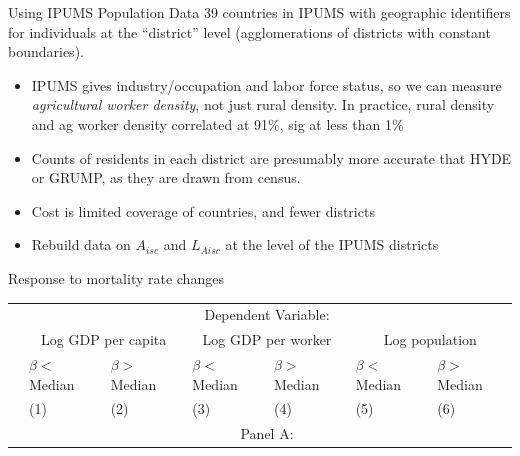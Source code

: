 \documentclass[10pt, xcolor=dvipsnames]{beamer}
\begin{document}
\begin{frame}{Using IPUMS Population Data}\label{ipums}
39 countries in IPUMS with geographic identifiers for individuals at the ``district'' level (agglomerations of districts with constant boundaries). 
\begin{itemize}
  \item IPUMS gives industry/occupation and labor force status, so we can measure \textit{agricultural worker density}, not just rural density. In practice, rural density and ag worker density correlated at 91\%, sig at less than 1\%
  \item Counts of residents in each district are presumably more accurate that HYDE or GRUMP, as they are drawn from census. 
  \item Cost is limited coverage of countries, and fewer districts
  \item Rebuild data on $A_{isc}$ and $L_{Aisc}$ at the level of the IPUMS districts
\end{itemize}

\hfill \hyperlink{pop}{}
\end{frame}


\begin{frame}{Response to mortality rate changes}\label{mortality}

{\footnotesize
\begin{tabularx}{\textwidth}{lXXXXXX}
\midrule
 & \multicolumn{6}{c}{Dependent Variable:} \\ \cmidrule(lr){2-7}
 & \multicolumn{2}{c}{Log GDP per capita} & \multicolumn{2}{c}{Log GDP per worker} & \multicolumn{2}{c}{Log population} \\ \cmidrule(lr){2-3} \cmidrule(lr){4-5} \cmidrule(lr){6-7}
 & $\beta<$Median & $\beta>$Median & $\beta<$Median & $\beta>$Median & $\beta<$Median & $\beta>$Median \\
 & (1) & (2) & (3) & (4) & (5) & (6) \\
\midrule
 & \multicolumn{6}{c}{Panel A:} \\ \cmidrule(lr){2-7}

\midrule

\end{tabularx}
}
\end{frame}
\end{document}
